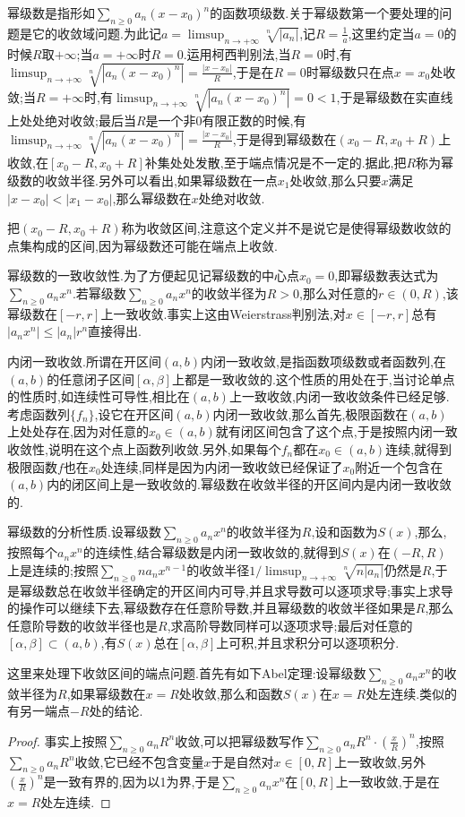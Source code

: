 幂级数是指形如$\sum_{n\ge0}a_n(x-x_0)^n$的函数项级数.关于幂级数第一个要处理的问题是它的收敛域问题.为此记$a=\limsup_{n\to+\infty}\sqrt[n]{|a_n|}$,记$R=\frac{1}{a}$,这里约定当$a=0$的时候$R$取$+\infty$;当$a=+\infty$时$R=0$.运用柯西判别法,当$R=0$时,有$\limsup_{n\to+\infty}\sqrt[n]{|a_n(x-x_0)^n|}=\frac{|x-x_0|}{R}$,于是在$R=0$时幂级数只在点$x=x_0$处收敛;当$R=+\infty$时,有$\limsup_{n\to+\infty}\sqrt[n]{|a_n(x-x_0)^n|}=0<1$,于是幂级数在实直线上处处绝对收敛;最后当$R$是一个非0有限正数的时候,有$\limsup_{n\to+\infty}\sqrt[n]{|a_n(x-x_0)^n|}=\frac{|x-x_0|}{R}$,于是得到幂级数在$(x_0-R,x_0+R)$上收敛,在$[x_0-R,x_0+R]$补集处处发散,至于端点情况是不一定的.据此,把$R$称为幂级数的收敛半径.另外可以看出,如果幂级数在一点$x_1$处收敛,那么只要$x$满足$|x-x_0|<|x_1-x_0|$,那么幂级数在$x$处绝对收敛.

把$(x_0-R,x_0+R)$称为收敛区间,注意这个定义并不是说它是使得幂级数收敛的点集构成的区间,因为幂级数还可能在端点上收敛.

幂级数的一致收敛性.为了方便起见记幂级数的中心点$x_0=0$,即幂级数表达式为$\sum_{n\ge0}a_nx^n$.若幂级数$\sum_{n\ge0}a_nx^n$的收敛半径为$R>0$,那么对任意的$r\in(0,R)$,该幂级数在$[-r,r]$上一致收敛.事实上这由Weierstrass判别法,对$x\in[-r,r]$总有$|a_nx^n|\le|a_n|r^n$直接得出.

内闭一致收敛.所谓在开区间$(a,b)$内闭一致收敛,是指函数项级数或者函数列,在$(a,b)$的任意闭子区间$[\alpha,\beta]$上都是一致收敛的.这个性质的用处在于,当讨论单点的性质时,如连续性可导性,相比在$(a,b)$上一致收敛,内闭一致收敛条件已经足够.考虑函数列$\{f_n\}$,设它在开区间$(a,b)$内闭一致收敛,那么首先,极限函数在$(a,b)$上处处存在,因为对任意的$x_0\in(a,b)$就有闭区间包含了这个点,于是按照内闭一致收敛性,说明在这个点上函数列收敛.另外,如果每个$f_n$都在$x_0\in(a,b)$连续,就得到极限函数$f$也在$x_0$处连续,同样是因为内闭一致收敛已经保证了$x_0$附近一个包含在$(a,b)$内的闭区间上是一致收敛的.幂级数在收敛半径的开区间内是内闭一致收敛的.

幂级数的分析性质.设幂级数$\sum_{n\ge0}a_nx^n$的收敛半径为$R$,设和函数为$S(x)$,那么,按照每个$a_nx^n$的连续性,结合幂级数是内闭一致收敛的,就得到$S(x)$在$(-R,R)$上是连续的;按照$\sum_{n\ge0}na_nx^{n-1}$的收敛半径$1/\limsup_{n\to+\infty}\sqrt[n]{n|a_n|}$仍然是$R$,于是幂级数总在收敛半径确定的开区间内可导,并且求导数可以逐项求导;事实上求导的操作可以继续下去,幂级数存在任意阶导数,并且幂级数的收敛半径如果是$R$,那么任意阶导数的收敛半径也是$R$,求高阶导数同样可以逐项求导;最后对任意的$[\alpha,\beta]\subset(a,b)$,有$S(x)$总在$[\alpha,\beta]$上可积,并且求积分可以逐项积分.

这里来处理下收敛区间的端点问题.首先有如下Abel定理:设幂级数$\sum_{n\ge0}a_nx^n$的收敛半径为$R$,如果幂级数在$x=R$处收敛,那么和函数$S(x)$在$x=R$处左连续.类似的有另一端点$-R$处的结论.
\begin{proof}
	
	事实上按照$\sum_{n\ge0}a_nR^n$收敛,可以把幂级数写作$\sum_{n\ge0}a_nR^n\cdot\left(\frac{x}{R}\right)^n$,按照$\sum_{n\ge0}a_nR^n$收敛,它已经不包含变量$x$于是自然对$x\in[0,R]$上一致收敛,另外$\left(\frac{x}{R}\right)^n$是一致有界的,因为以1为界,于是$\sum_{n\ge0}a_nx^n$在$[0,R]$上一致收敛,于是在$x=R$处左连续.
	
\end{proof}

